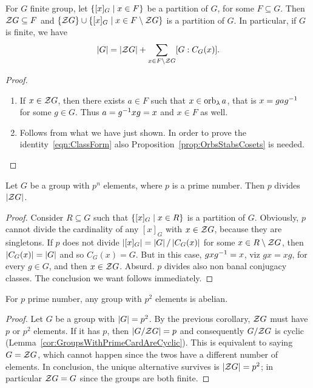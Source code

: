 \begin{proposition}\label{prop:ClassFormula}
For \(G\) finite group, let \(\left\{[x]_G \mid x \in F\right\}\) be a partition of \(G\), for some \(F \subseteq G\). Then \(\mathcal Z G \subseteq F\) and \(\left\{\mathcal Z G\right\} \cup \left\{[x]_G \mid x \in F \setminus \mathcal Z G\right\}\) is a partition of \(G\). In particular, if \(G\) is finite, we have
\begin{equation}\left\lvert G\right\rvert = \left\lvert\mathcal Z G\right\rvert + \sum_{x \in F \setminus \mathcal Z G} [G:C_G(x)] .\label{eqn:ClassForm}\end{equation}
\end{proposition}

\begin{proof}
\begin{enumerate}
\item If \(x \in \mathcal Z G\), then there exists \(a \in F\) such that \(x \in \operatorname{orb}_\lambda a\), that is \(x = g a g^{-1}\) for some \(g \in G\). Thus \(a = g^{-1} x g = x\) and \(x \in F\) as well.
\item Follows from what we have just shown. In order to prove the identity~\eqref{eqn:ClassForm} also Proposition~\ref{prop:OrbsStabsCosets} is needed.\qedhere
\end{enumerate}
\end{proof}

\begin{corollary}
Let \(G\) be a group with \(p^n\) elements, where \(p\) is a prime number. Then \(p\) divides \(\left\lvert\mathcal Z G\right\rvert\).
\end{corollary}

\begin{proof}
Consider \(R \subseteq G\) such that \(\left\{[x]_G \mid x \in R\right\}\) is a partition of \(G\). Obviously, \(p\) cannot divide the cardinality of any \([x]_G\) with \(x \in \mathcal Z G\), because they are singletons. If \(p\) does not divide \(\left\lvert[x]_G\right\rvert = \left\lvert G\right\rvert / \left\lvert C_G(x)\right\rvert\) for some \(x \in R \setminus \mathcal Z G\), then \(\left\lvert C_G (x)\right\rvert = \left\lvert G\right\rvert\) and so \(C_G(x) = G\). But in this case, \(g x g^{-1} = x\), viz \(gx = xg\), for every \(g \in G\), and then \(x \in \mathcal Z G\). Absurd. \(p\) divides also non banal conjugacy classes. The conclusion we want follows immediately.
\end{proof}

\begin{corollary}
For \(p\) prime number, any group with \(p^2\) elements is abelian.
\end{corollary}

\begin{proof}
Let \(G\) be a group with \(\left\lvert G\right\rvert = p^2\). By the previous corollary, \(\mathcal Z G\) must have \(p\) or \(p^2\) elements. If it has \(p\), then \(\left\lvert G / \mathcal Z G\right\rvert = p\) and consequently \(G/\mathcal Z G\) is cyclic (Lemma~\ref{cor:GroupsWithPrimeCardAreCyclic}). This is equivalent to saying \(G = \mathcal Z G\), which cannot happen since the twos have a different number of elements. In conclusion, the unique alternative survives is \(\left\lvert\mathcal Z G\right\rvert = p^2\); in particular \(\mathcal Z G = G\) since the groups are both finite.
\end{proof}

